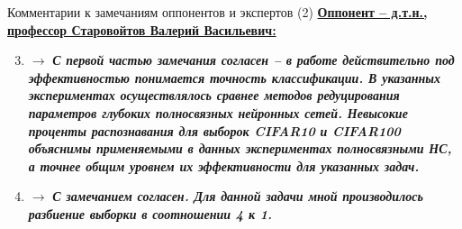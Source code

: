 \documentclass[10pt]{beamer}
\begin{document}
\begin{frame}{Комментарии к замечаниям оппонентов и экспертов (2)}
    \small
    \underline{\textbf{Оппонент -- д.т.н., профессор Старовойтов Валерий Васильевич:}}
    \begin{enumerate}
        \setcounter{enumi}{2}
        \item {}

        $\rightarrow$ \textit{\textbf{С первой частью замечания согласен -- в работе действительно под эффективностью понимается точность классификации. В указанных экспериментах осуществлялось сравнее методов редуцирования параметров глубоких полносвязных нейронных сетей. Невысокие проценты распознавания для выборок CIFAR10 и CIFAR100 объяснимы применяемыми в данных экспериментах полносвязными НС, а точнее общим уровнем их эффективности для указанных задач.}}
        \item {}
        
        $\rightarrow$ \textit{\textbf{С замечанием согласен. Для данной задачи мной производилось разбиение выборки в соотношении 4 к 1.}}%
    \end{enumerate}
\end{frame}
\end{document}
